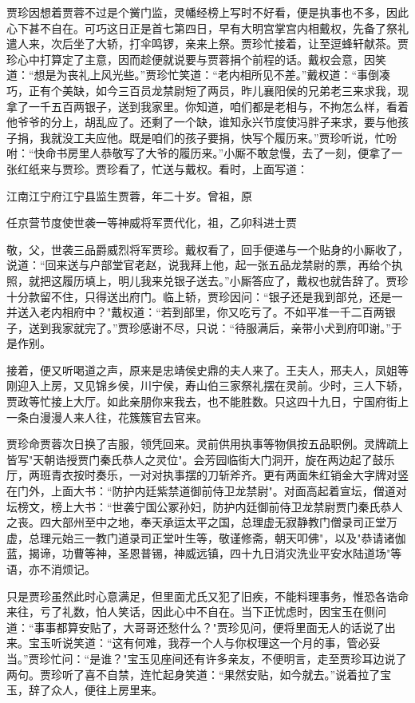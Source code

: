 贾珍因想着贾蓉不过是个黉门监，灵幡经榜上写时不好看，便是执事也不多，因此心下甚不自在。可巧这日正是首七第四日，早有大明宫掌宫内相戴权，先备了祭礼遣人来，次后坐了大轿，打伞鸣锣，亲来上祭。贾珍忙接着，让至逗蜂轩献茶。贾珍心中打算定了主意，因而趁便就说要与贾蓉捐个前程的话。戴权会意，因笑道：“想是为丧礼上风光些。”贾珍忙笑道：“老内相所见不差。”戴权道：“事倒凑巧，正有个美缺，如今三百员龙禁尉短了两员，昨儿襄阳侯的兄弟老三来求我，现拿了一千五百两银子，送到我家里。你知道，咱们都是老相与，不拘怎么样，看着他爷爷的分上，胡乱应了。还剩了一个缺，谁知永兴节度使冯胖子来求，要与他孩子捐，我就没工夫应他。既是咱们的孩子要捐，快写个履历来。”贾珍听说，忙吩咐：“快命书房里人恭敬写了大爷的履历来。”小厮不敢怠慢，去了一刻，便拿了一张红纸来与贾珍。贾珍看了，忙送与戴权。看时，上面写道：

江南江宁府江宁县监生贾蓉，年二十岁。曾祖，原

任京营节度使世袭一等神威将军贾代化，祖，乙卯科进士贾

敬，父，世袭三品爵威烈将军贾珍。戴权看了，回手便递与一个贴身的小厮收了，说道：“回来送与户部堂官老赵，说我拜上他，起一张五品龙禁尉的票，再给个执照，就把这履历填上，明儿我来兑银子送去。”小厮答应了，戴权也就告辞了。贾珍十分款留不住，只得送出府门。临上轿，贾珍因问：“银子还是我到部兑，还是一并送入老内相府中？"戴权道：“若到部里，你又吃亏了。不如平准一千二百两银子，送到我家就完了。”贾珍感谢不尽，只说：“待服满后，亲带小犬到府叩谢。”于是作别。

接着，便又听喝道之声，原来是忠靖侯史鼎的夫人来了。王夫人，邢夫人，凤姐等刚迎入上房，又见锦乡侯，川宁侯，寿山伯三家祭礼摆在灵前。少时，三人下轿，贾政等忙接上大厅。如此亲朋你来我去，也不能胜数。只这四十九日，宁国府街上一条白漫漫人来人往，花簇簇官去官来。

贾珍命贾蓉次日换了吉服，领凭回来。灵前供用执事等物俱按五品职例。灵牌疏上皆写"天朝诰授贾门秦氏恭人之灵位"。会芳园临街大门洞开，旋在两边起了鼓乐厅，两班青衣按时奏乐，一对对执事摆的刀斩斧齐。更有两面朱红销金大字牌对竖在门外，上面大书：“防护内廷紫禁道御前侍卫龙禁尉"。对面高起着宣坛，僧道对坛榜文，榜上大书：“世袭宁国公冢孙妇，防护内廷御前侍卫龙禁尉贾门秦氏恭人之丧。四大部州至中之地，奉天承运太平之国，总理虚无寂静教门僧录司正堂万虚，总理元始三一教门道录司正堂叶生等，敬谨修斋，朝天叩佛"，以及"恭请诸伽蓝，揭谛，功曹等神，圣恩普锡，神威远镇，四十九日消灾洗业平安水陆道场"等语，亦不消烦记。

只是贾珍虽然此时心意满足，但里面尤氏又犯了旧疾，不能料理事务，惟恐各诰命来往，亏了礼数，怕人笑话，因此心中不自在。当下正忧虑时，因宝玉在侧问道：“事事都算安贴了，大哥哥还愁什么？"贾珍见问，便将里面无人的话说了出来。宝玉听说笑道：“这有何难，我荐一个人与你权理这一个月的事，管必妥当。”贾珍忙问：“是谁？"宝玉见座间还有许多亲友，不便明言，走至贾珍耳边说了两句。贾珍听了喜不自禁，连忙起身笑道：“果然安贴，如今就去。”说着拉了宝玉，辞了众人，便往上房里来。


